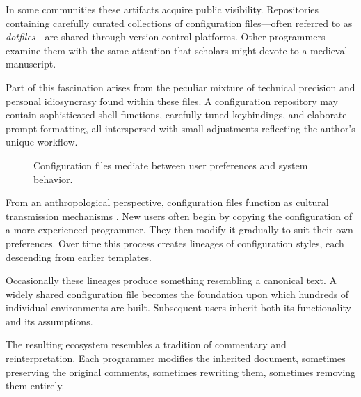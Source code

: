 \documentclass[11pt]{article}
\theoremstyle{definition}
\begin{document}
In some communities these artifacts acquire public visibility.
Repositories containing carefully curated collections of configuration
files—often referred to as \emph{dotfiles}—are shared through version
control platforms. Other programmers examine them with the same
attention that scholars might devote to a medieval manuscript.

Part of this fascination arises from the peculiar mixture of technical
precision and personal idiosyncrasy found within these files. A
configuration repository may contain sophisticated shell functions,
carefully tuned keybindings, and elaborate prompt formatting, all
interspersed with small adjustments reflecting the author's unique
workflow.

\begin{figure}[h]
\centering
{}
\caption{Configuration files mediate between user preferences and
system behavior.}
\end{figure}

From an anthropological perspective, configuration files function as
cultural transmission mechanisms \cite{raymond2003}. New users often begin by copying the
configuration of a more experienced programmer. They then modify it
gradually to suit their own preferences. Over time this process creates
lineages of configuration styles, each descending from earlier
templates.

Occasionally these lineages produce something resembling a canonical
text. A widely shared configuration file becomes the foundation upon
which hundreds of individual environments are built. Subsequent users
inherit both its functionality and its assumptions.

The resulting ecosystem resembles a tradition of commentary and
reinterpretation. Each programmer modifies the inherited document,
sometimes preserving the original comments, sometimes rewriting them,
sometimes removing them entirely.
\end{document}
